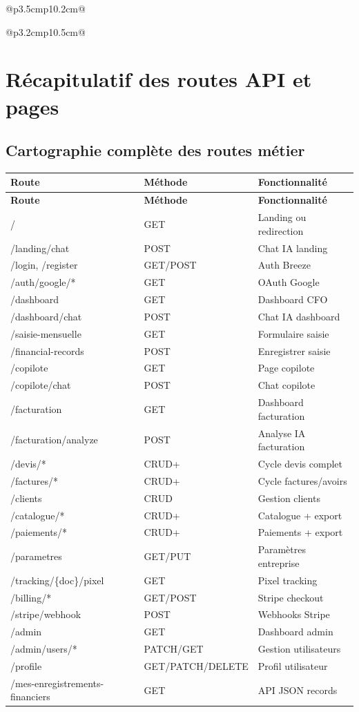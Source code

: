 \documentclass[11pt,a4paper]{report}
\begin{document}
\begin{longtable}{@{}p{3.5cm}p{10.2cm}@{}}
\begin{longtable}{@{}p{3.2cm}p{10.5cm}@{}}
\chapter{Récapitulatif des routes API et pages}

\section{Cartographie complète des routes métier}

\begingroup
\footnotesize
\begin{longtable}{@{}p{4.8cm}p{2.2cm}p{7.5cm}@{}}
\toprule
\textbf{Route} & \textbf{Méthode} & \textbf{Fonctionnalité} \\
\midrule
\endfirsthead
\toprule
\textbf{Route} & \textbf{Méthode} & \textbf{Fonctionnalité} \\
\midrule
\endhead
\bottomrule
\endfoot
/ & GET & Landing ou redirection \\
/landing/chat & POST & Chat IA landing \\
/login, /register & GET/POST & Auth Breeze \\
/auth/google/* & GET & OAuth Google \\
/dashboard & GET & Dashboard CFO \\
/dashboard/chat & POST & Chat IA dashboard \\
/saisie-mensuelle & GET & Formulaire saisie \\
/financial-records & POST & Enregistrer saisie \\
/copilote & GET & Page copilote \\
/copilote/chat & POST & Chat copilote \\
/facturation & GET & Dashboard facturation \\
/facturation/analyze & POST & Analyse IA facturation \\
/devis/* & CRUD+ & Cycle devis complet \\
/factures/* & CRUD+ & Cycle factures/avoirs \\
/clients & CRUD & Gestion clients \\
/catalogue/* & CRUD+ & Catalogue + export \\
/paiements/* & CRUD+ & Paiements + export \\
/parametres & GET/PUT & Paramètres entreprise \\
/tracking/\{doc\}/pixel & GET & Pixel tracking \\
/billing/* & GET/POST & Stripe checkout \\
/stripe/webhook & POST & Webhooks Stripe \\
/admin & GET & Dashboard admin \\
/admin/users/* & PATCH/GET & Gestion utilisateurs \\
/profile & GET/PATCH/DELETE & Profil utilisateur \\
/mes-enregistrements-financiers & GET & API JSON records \\
\bottomrule
\end{longtable}
\endgroup


\end{longtable}
\end{longtable}
\end{document}
